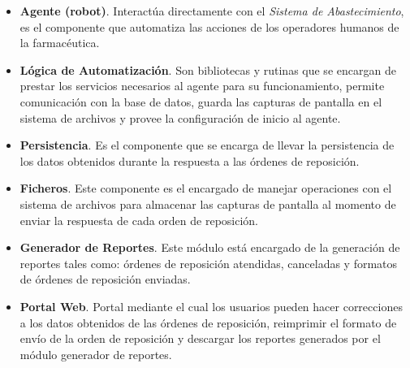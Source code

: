 \begin{itemize}
\item \textbf{Agente (robot)}. Interactúa directamente con el \textit{Sistema de Abastecimiento}, es el componente que automatiza las acciones de los operadores humanos de la farmacéutica.
\item \textbf{Lógica de Automatización}. Son bibliotecas y rutinas que se encargan de prestar los servicios necesarios al agente para su funcionamiento, permite comunicación con la base de datos, guarda las capturas de pantalla en el sistema de archivos y provee la configuración de inicio al agente.
\item \textbf{Persistencia}. Es el componente que se encarga de llevar la persistencia de los datos obtenidos durante la respuesta a las órdenes de reposición.
\item \textbf{Ficheros}. Este componente es el encargado de manejar operaciones con el sistema de archivos para almacenar las capturas de pantalla al momento de enviar la respuesta de cada orden de reposición.
\item \textbf{Generador de Reportes}. Este módulo está encargado de la generación de reportes tales como: órdenes de reposición atendidas, canceladas y formatos de órdenes de reposición enviadas.
\item \textbf{Portal Web}. Portal mediante el cual los usuarios pueden hacer correcciones a los datos obtenidos de las órdenes de reposición, reimprimir el formato de envío de la orden de reposición  y descargar los reportes generados por el módulo generador de reportes.
\end{itemize}

